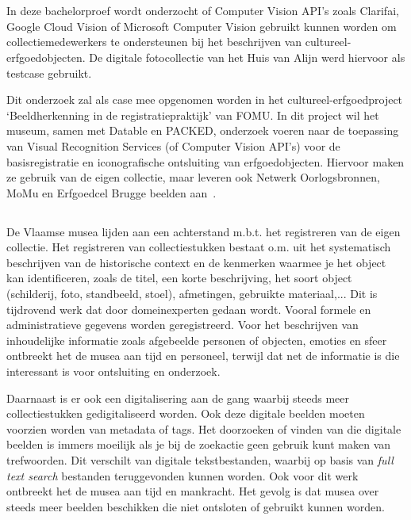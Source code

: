 
\chapter{}
\label{ch:inleiding}

In deze bachelorproef wordt onderzocht of Computer Vision API’s zoals Clarifai, Google Cloud Vision of Microsoft Computer Vision gebruikt kunnen worden om collectiemedewerkers te ondersteunen bij het beschrijven van cultureel-erfgoedobjecten. De digitale fotocollectie van het Huis van Alijn werd hiervoor als testcase gebruikt.

Dit onderzoek zal als case mee opgenomen worden in het cultureel-erfgoedproject ‘Beeldherkenning in de registratiepraktijk’ van FOMU. In dit project wil het museum, samen met Datable en PACKED, onderzoek voeren naar de toepassing van Visual Recognition Services (of Computer Vision API’s) voor de basisregistratie en iconografische ontsluiting van erfgoedobjecten. Hiervoor maken ze gebruik van de eigen collectie, maar leveren ook Netwerk Oorlogsbronnen, MoMu en Erfgoedcel Brugge beelden aan~\autocite{Derveaux2019}.


\section{}
\label{sec:probleemstelling}

De Vlaamse musea lijden aan een achterstand m.b.t. het registreren van de eigen collectie. Het registreren van collectiestukken bestaat o.m. uit het systematisch beschrijven van de historische context en de kenmerken waarmee je het object kan identificeren, zoals de titel, een korte beschrijving, het soort object (schilderij, foto, standbeeld, stoel), afmetingen, gebruikte materiaal,... Dit is tijdrovend werk dat door domeinexperten gedaan wordt. Vooral formele en administratieve gegevens worden geregistreerd. Voor het beschrijven van inhoudelijke informatie zoals afgebeelde personen of objecten, emoties en sfeer ontbreekt het de musea aan tijd en personeel, terwijl dat net de informatie is die interessant is voor ontsluiting en onderzoek.

Daarnaast is er ook een digitalisering aan de gang waarbij steeds meer collectiestukken gedigitaliseerd worden. Ook deze digitale beelden moeten voorzien worden van metadata of tags. Het doorzoeken of vinden van die digitale beelden is immers moeilijk als je bij de zoekactie geen gebruik kunt maken van trefwoorden. Dit verschilt van digitale tekstbestanden, waarbij op basis van \textit{full text search} bestanden teruggevonden kunnen worden. Ook voor dit werk ontbreekt het de musea aan tijd en mankracht. Het gevolg is dat musea over steeds meer beelden beschikken die niet ontsloten of gebruikt kunnen worden. 

